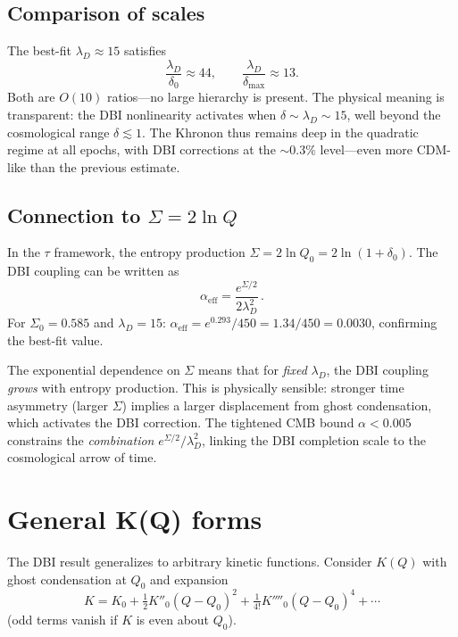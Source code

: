 \documentclass[prd,twocolumn,superscriptaddress,longbibliography,floatfix]{revtex4-2}
\newcommand{\tauasym}{\tau}
\begin{document}
\subsection{Comparison of scales}

The best-fit $\lambda_D \approx 15$ satisfies
\begin{equation}
\frac{\lambda_D}{\delta_0} \approx 44,
\qquad
\frac{\lambda_D}{\delta_{\max}} \approx 13.
\label{eq:ratios}
\end{equation}
Both are $O(10)$ ratios---no large hierarchy is
present.  The physical meaning is transparent:
the DBI nonlinearity activates when
$\delta \sim \lambda_D \sim 15$, well beyond
the cosmological range $\delta \lesssim 1$.
The Khronon thus remains deep in the
quadratic regime at all epochs, with DBI
corrections at the $\sim\!0.3\%$ level---even
more CDM-like than the previous estimate.

\subsection{Connection to $\Sigma = 2\ln Q$}

In the $\tauasym$ framework, the entropy production
$\Sigma = 2\ln Q_0 = 2\ln(1+\delta_0)$.
The DBI coupling can be written as
\begin{equation}
\alpha_{\mathrm{eff}} = \frac{e^{\Sigma/2}}{2\lambda_D^2}\,.
\label{eq:alpha_Sigma}
\end{equation}
For $\Sigma_0 = 0.585$ and $\lambda_D = 15$:
$\alpha_{\mathrm{eff}} = e^{0.293}/450 = 1.34/450
= 0.0030$, confirming the best-fit value.

The exponential dependence on $\Sigma$ means that
for \emph{fixed} $\lambda_D$, the DBI coupling
\emph{grows} with entropy production.  This is
physically sensible: stronger time asymmetry (larger
$\Sigma$) implies a larger displacement from ghost
condensation, which activates the DBI correction.
The tightened CMB bound $\alpha < 0.005$ constrains the
\emph{combination} $e^{\Sigma/2}/\lambda_D^2$,
linking the DBI completion scale to the cosmological
arrow of time.


\section{General K(Q) forms}
\label{sec:general}

The DBI result generalizes to arbitrary kinetic functions.
Consider $K(Q)$ with ghost condensation at $Q_0$ and
expansion
\begin{equation}
K = K_0 + \tfrac{1}{2}K''_0(Q - Q_0)^2
+ \tfrac{1}{4!}K''''_0(Q - Q_0)^4 + \cdots
\label{eq:general_K}
\end{equation}
(odd terms vanish if $K$ is even about $Q_0$).
\end{document}
